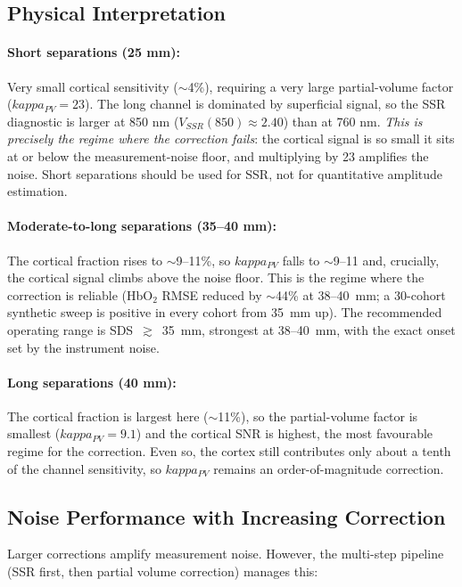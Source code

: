 \documentclass[12pt]{article}
\def\kappa{kappa}%
\def\mathrm#1{#1}%
\def\text#1{#1}%
\def\,{ }%
\begin{document}
\subsection{Physical Interpretation}

\paragraph{Short separations (25 mm):} Very small cortical sensitivity ($\sim$4\%), requiring a very large partial-volume factor ($\kappa_{\text{PV}} = 23$). The long channel is dominated by superficial signal, so the SSR diagnostic is larger at 850\,nm ($V_{\mathrm{SSR}}(850)\approx2.40$) than at 760\,nm. \emph{This is precisely the regime where the correction fails}: the cortical signal is so small it sits at or below the measurement-noise floor, and multiplying by 23 amplifies the noise. Short separations should be used for SSR, not for quantitative amplitude estimation.

\paragraph{Moderate-to-long separations (35--40 mm):} The cortical fraction rises to $\sim$9--11\%, so $\kappa_{\text{PV}}$ falls to $\sim$9--11 and, crucially, the cortical signal climbs above the noise floor. This is the regime where the correction is reliable (HbO$_2$ RMSE reduced by $\sim$44\% at 38--40~mm; a 30-cohort synthetic sweep is positive in every cohort from 35~mm up). The recommended operating range is SDS~$\gtrsim$~35~mm, strongest at 38--40~mm, with the exact onset set by the instrument noise.

\paragraph{Long separations (40 mm):} The cortical fraction is largest here ($\sim$11\%), so the partial-volume factor is smallest ($\kappa_{\text{PV}} = 9.1$) and the cortical SNR is highest, the most favourable regime for the correction. Even so, the cortex still contributes only about a tenth of the channel sensitivity, so $\kappa_{\text{PV}}$ remains an order-of-magnitude correction.

\subsection{Noise Performance with Increasing Correction}

Larger corrections amplify measurement noise. However, the multi-step pipeline (SSR first, then partial volume correction) manages this:
\end{document}
